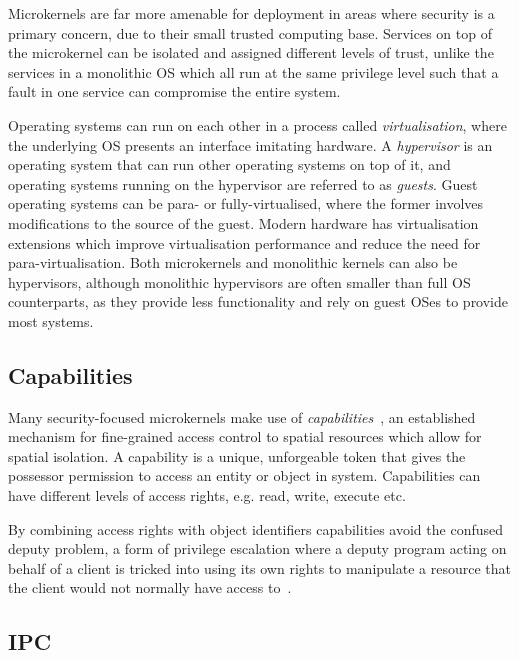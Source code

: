 Microkernels are far more amenable for deployment in areas where security is a primary concern,
due to their small trusted computing base.
Services on top of the microkernel can be isolated and assigned different levels of trust, unlike
the services in a monolithic \gls{OS} which all run at the same privilege level such that a fault in
one service can compromise the entire system. 

Operating systems can run on each other in a process called \emph{virtualisation}, where the
underlying OS presents an interface imitating hardware. A \emph{hypervisor} is an operating system that can
run other operating systems on top of it, and operating systems running on the hypervisor are
referred to as \emph{guests}. Guest operating systems can be para- or fully-virtualised, where the
former involves modifications to the source of the guest. Modern hardware has virtualisation
extensions which improve virtualisation performance and reduce the need for para-virtualisation.
Both microkernels and monolithic kernels can also be hypervisors, although monolithic hypervisors
are often smaller than full OS counterparts, as they provide less functionality and rely on guest
OSes to provide most systems. 

\subsection{Capabilities}
\label{s:b-capabilities}

Many security-focused microkernels make use of \emph{capabilities}~\citep{Dennis_VanHorn_66}, an
established mechanism for fine-grained access control to spatial resources which allow for spatial
    isolation. A capability is a unique, unforgeable token that gives the possessor permission to access
an entity or object in system. Capabilities can have different levels of access rights, e.g. read,
write, execute etc. 

By combining access rights with object identifiers capabilities avoid the
confused deputy problem, a form of privilege escalation where a deputy program
acting on behalf of a client is  tricked into using
its own rights to manipulate a resource that the client would not normally have access
to~\citep{Hardy_88}. 

\subsection{IPC}
\label{s:background-ipc}

